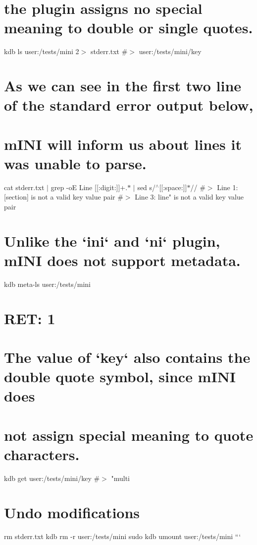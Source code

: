 \hypertarget{autotoc_md377_autotoc_md396}{}\section{the plugin assigns no special meaning to double or single quotes.}\label{autotoc_md377_autotoc_md396}
kdb ls user\+:/tests/mini 2$>$ stderr.\+txt \#$>$ user\+:/tests/mini/key\hypertarget{autotoc_md377_autotoc_md397}{}\section{As we can see in the first two line of the standard error output below,}\label{autotoc_md377_autotoc_md397}
\hypertarget{autotoc_md377_autotoc_md398}{}\section{m\+I\+N\+I will inform us about lines it was unable to parse.}\label{autotoc_md377_autotoc_md398}
cat stderr.\+txt $\vert$ grep -\/oE \textquotesingle{}Line \mbox{[}\mbox{[}\+:digit\+:\mbox{]}\mbox{]}+.$\ast$\textquotesingle{} $\vert$ sed \textquotesingle{}s/$^\wedge$\mbox{[}\mbox{[}\+:space\+:\mbox{]}\mbox{]}$\ast$//\textquotesingle{} \#$>$ Line 1\+: \textquotesingle{}\mbox{[}section\mbox{]}\textquotesingle{} is not a valid key value pair \#$>$ Line 3\+: \textquotesingle{}line"\textquotesingle{} is not a valid key value pair\hypertarget{autotoc_md377_autotoc_md399}{}\section{Unlike the `ini` and `ni` plugin, m\+I\+N\+I does not support metadata.}\label{autotoc_md377_autotoc_md399}
kdb meta-\/ls user\+:/tests/mini \hypertarget{autotoc_md377_autotoc_md400}{}\section{R\+E\+T\+: 1}\label{autotoc_md377_autotoc_md400}
\hypertarget{autotoc_md377_autotoc_md401}{}\section{The value of `key` also contains the double quote symbol, since m\+I\+N\+I does}\label{autotoc_md377_autotoc_md401}
\hypertarget{autotoc_md377_autotoc_md402}{}\section{not assign special meaning to quote characters.}\label{autotoc_md377_autotoc_md402}
kdb get user\+:/tests/mini/key \#$>$ "multi\hypertarget{autotoc_md377_autotoc_md403}{}\section{Undo modifications}\label{autotoc_md377_autotoc_md403}
rm stderr.\+txt kdb rm -\/r user\+:/tests/mini sudo kdb umount user\+:/tests/mini ``` 